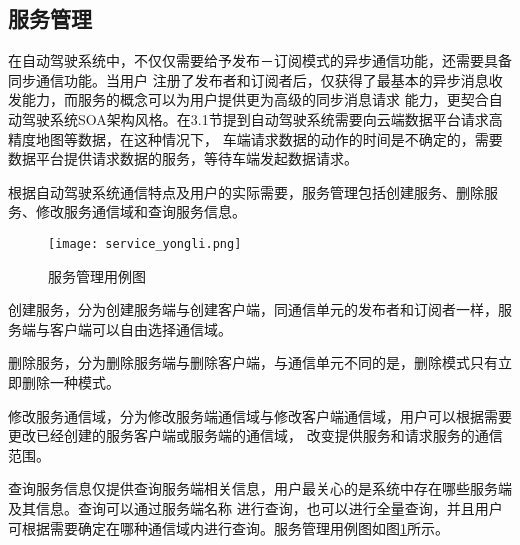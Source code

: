   
\subsection{服务管理}
在自动驾驶系统中，不仅仅需要给予发布－订阅模式的异步通信功能，还需要具备同步通信功能。当用户
注册了发布者和订阅者后，仅获得了最基本的异步消息收发能力，而服务的概念可以为用户提供更为高级的同步消息请求
能力，更契合自动驾驶系统SOA架构风格。在3.1节提到自动驾驶系统需要向云端数据平台请求高精度地图等数据，在这种情况下，
车端请求数据的动作的时间是不确定的，需要数据平台提供请求数据的服务，等待车端发起数据请求。

根据自动驾驶系统通信特点及用户的实际需要，服务管理包括创建服务、删除服务、修改服务通信域和查询服务信息。

\begin{figure}[H]
  \centering
  \texttt{[image: service\_yongli.png]}
  \caption{服务管理用例图}
  \label{service_yongli}
\end{figure}

创建服务，分为创建服务端与创建客户端，同通信单元的发布者和订阅者一样，服务端与客户端可以自由选择通信域。

删除服务，分为删除服务端与删除客户端，与通信单元不同的是，删除模式只有立即删除一种模式。

修改服务通信域，分为修改服务端通信域与修改客户端通信域，用户可以根据需要更改已经创建的服务客户端或服务端的通信域，
改变提供服务和请求服务的通信范围。

查询服务信息仅提供查询服务端相关信息，用户最关心的是系统中存在哪些服务端及其信息。查询可以通过服务端名称
进行查询，也可以进行全量查询，并且用户可根据需要确定在哪种通信域内进行查询。服务管理用例图如图\ref{service_yongli}所示。


